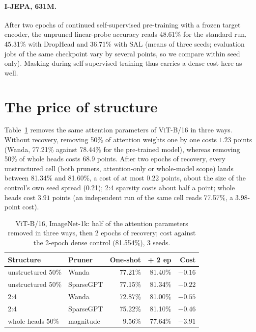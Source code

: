 \documentclass[11pt,a4paper]{article}
\begin{document}
\paragraph{I-JEPA, 631M.} After two epochs of continued self-supervised pre-training with a frozen target encoder, the unpruned linear-probe accuracy reads 48.61\% for the standard run, 45.31\% with DropHead and 36.71\% with SAL (means of three seeds; evaluation jobs of the same checkpoint vary by several points, so we compare within seed only). Masking during self-supervised training thus carries a dense cost here as well.

\section{The price of structure}
\label{sec:structure}

Table~\ref{tab:structure} removes the same attention parameters of ViT-B/16 in three ways. Without recovery, removing 50\% of attention weights one by one costs $1.23$ points (Wanda, 77.21\% against 78.44\% for the pre-trained model), whereas removing 50\% of whole heads costs $68.9$ points. After two epochs of recovery, every unstructured cell (both pruners, attention-only or whole-model scope) lands between 81.34\% and 81.60\%, a cost of at most 0.22 points, about the size of the control's own seed spread (0.21); 2:4 sparsity costs about half a point; whole heads cost $3.91$ points (an independent run of the same cell reads 77.57\%, a $3.98$-point cost).

\begin{table}[t]
\centering
\caption{ViT-B/16, ImageNet-1k: half of the attention parameters removed in three ways, then 2 epochs of recovery; cost against the 2-epoch dense control (81.554\%), 3 seeds.}
\label{tab:structure}
\begin{tabular}{llrrr}
\toprule
Structure & Pruner & One-shot & + 2 ep & Cost \\
\midrule
unstructured 50\% & Wanda & 77.21\% & 81.40\% & $-0.16$ \\
unstructured 50\% & SparseGPT & 77.15\% & 81.34\% & $-0.22$ \\
2:4 & Wanda & 72.87\% & 81.00\% & $-0.55$ \\
2:4 & SparseGPT & 75.22\% & 81.10\% & $-0.46$ \\
whole heads 50\% & magnitude & 9.56\% & 77.64\% & $-3.91$ \\
\bottomrule
\end{tabular}
\end{table}
\end{document}
